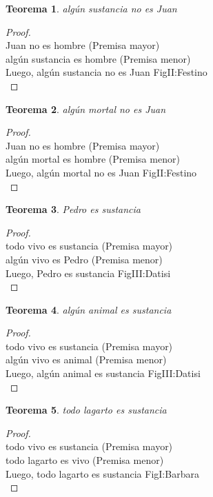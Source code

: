 ﻿\documentclass[12pt]{book}
\newtheorem{theorem}{Teorema}[chapter]
\newtheorem{proof}{Demostración}
\begin{document}
\begin{theorem}
algún sustancia no es Juan
\label{th: 94}
\end{theorem}\begin{proof}\\Juan no es hombre	 (Premisa mayor) \\algún sustancia es hombre	 (Premisa menor) \\Luego, algún sustancia no es Juan	FigII:Festino \\ \end{proof}
\begin{theorem}
algún mortal no es Juan
\label{th: 95}
\end{theorem}\begin{proof}\\Juan no es hombre	 (Premisa mayor) \\algún mortal es hombre	 (Premisa menor) \\Luego, algún mortal no es Juan	FigII:Festino \\ \end{proof}
\begin{theorem}
Pedro es sustancia
\label{th: 96}
\end{theorem}\begin{proof}\\todo vivo es sustancia	 (Premisa mayor) \\algún vivo es Pedro	 (Premisa menor) \\Luego, Pedro es sustancia	FigIII:Datisi \\ \end{proof}
\begin{theorem}
algún animal es sustancia
\label{th: 97}
\end{theorem}\begin{proof}\\todo vivo es sustancia	 (Premisa mayor) \\algún vivo es animal	 (Premisa menor) \\Luego, algún animal es sustancia	FigIII:Datisi \\ \end{proof}
\begin{theorem}
todo lagarto es sustancia
\label{th: 98}
\end{theorem}\begin{proof}\\todo vivo es sustancia	 (Premisa mayor) \\todo lagarto es vivo	 (Premisa menor) \\Luego, todo lagarto es sustancia	FigI:Barbara \\ \end{proof}
\end{document}
